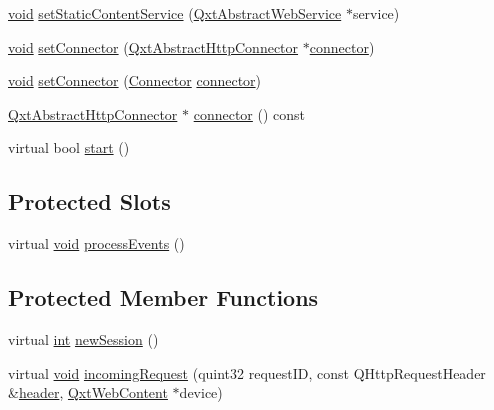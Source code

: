 \begin{DoxyCompactItemize}
\item 
\hyperlink{group___u_a_v_objects_plugin_ga444cf2ff3f0ecbe028adce838d373f5c}{void} \hyperlink{class_qxt_http_session_manager_a2fbe3f7c2bbe85c90deca2843b5b8610}{set\-Static\-Content\-Service} (\hyperlink{class_qxt_abstract_web_service}{Qxt\-Abstract\-Web\-Service} $\ast$service)
\item 
\hyperlink{group___u_a_v_objects_plugin_ga444cf2ff3f0ecbe028adce838d373f5c}{void} \hyperlink{class_qxt_http_session_manager_aa4365b77750d34b5edd38a0729ec028e}{set\-Connector} (\hyperlink{class_qxt_abstract_http_connector}{Qxt\-Abstract\-Http\-Connector} $\ast$\hyperlink{class_qxt_http_session_manager_a9d6ec979fb50b26120ca11e9dfdb7c2b}{connector})
\item 
\hyperlink{group___u_a_v_objects_plugin_ga444cf2ff3f0ecbe028adce838d373f5c}{void} \hyperlink{class_qxt_http_session_manager_a6fb6d4d9ead55218b6c76c1f7cbbcf61}{set\-Connector} (\hyperlink{class_qxt_http_session_manager_ab2d71d18915557dfea9d009f7af4f9ca}{Connector} \hyperlink{class_qxt_http_session_manager_a9d6ec979fb50b26120ca11e9dfdb7c2b}{connector})
\item 
\hyperlink{class_qxt_abstract_http_connector}{Qxt\-Abstract\-Http\-Connector} $\ast$ \hyperlink{class_qxt_http_session_manager_a9d6ec979fb50b26120ca11e9dfdb7c2b}{connector} () const 
\item 
virtual bool \hyperlink{class_qxt_http_session_manager_ab69e72d7fbabb35d88fc7969aa1c2458}{start} ()
\end{DoxyCompactItemize}
\subsection*{Protected Slots}
\begin{DoxyCompactItemize}
\item 
virtual \hyperlink{group___u_a_v_objects_plugin_ga444cf2ff3f0ecbe028adce838d373f5c}{void} \hyperlink{class_qxt_http_session_manager_a072d11b7d58cbf20e47b1524f2509c86}{process\-Events} ()
\end{DoxyCompactItemize}
\subsection*{Protected Member Functions}
\begin{DoxyCompactItemize}
\item 
virtual \hyperlink{ioapi_8h_a787fa3cf048117ba7123753c1e74fcd6}{int} \hyperlink{class_qxt_http_session_manager_ac7f39616d3082155f9a9467ec750a092}{new\-Session} ()
\item 
virtual \hyperlink{group___u_a_v_objects_plugin_ga444cf2ff3f0ecbe028adce838d373f5c}{void} \hyperlink{class_qxt_http_session_manager_a5a21b13209f7dbc2b206191e4bd890a7}{incoming\-Request} (quint32 request\-I\-D, const Q\-Http\-Request\-Header \&\hyperlink{crypt_8h_ae4f2f0852899a81dcd9b8a02e559f0f7}{header}, \hyperlink{class_qxt_web_content}{Qxt\-Web\-Content} $\ast$device)
\end{DoxyCompactItemize}

